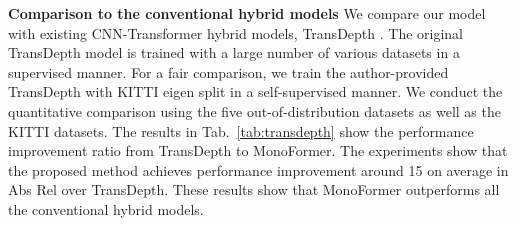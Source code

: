 \documentclass[letterpaper]{article} \usepackage{aaai23}  \usepackage{times}  \usepackage{helvet}  \usepackage{courier}  \usepackage[hyphens]{url}  \usepackage{graphicx} \urlstyle{rm} \def\UrlFont{\rm}  \usepackage{natbib}  \usepackage{caption} \frenchspacing  \setlength{\pdfpagewidth}{8.5in} \setlength{\pdfpageheight}{11in} \usepackage{algorithm}
\newcommand{\tabref}[1]{Tab.~\ref{#1}}
\begin{document}
\begin{table}[!t]
    \centering
    \small
    \caption{\textbf{Ablation study on backbone network.} We use only Transformers (ViT), CNNs (ResNet), and hybrid models (TransDepth \cite{yang2021transformer} and ours). ViT-B and ViT-L are the base and large ViT \cite{dosovitskiy2020image}, respectively. TransDepth and ours use the combination of ResNet50 and ViT-B/16. }
    \vspace{-2mm}
\label{table4_ablation_backbone}
\end{table}


\noindent \textbf{Comparison to the conventional hybrid models} 
We compare our model with existing CNN-Transformer hybrid models, TransDepth \cite{yang2021transformer}. The original TransDepth model is trained with a large number of various datasets in a supervised manner. For a fair comparison, we train the author-provided TransDepth with KITTI eigen split in a self-supervised manner. We conduct the quantitative comparison using the five out-of-distribution datasets as well as the KITTI datasets. The results in \tabref{tab:transdepth} show the performance improvement ratio from TransDepth to MonoFormer. The experiments show that the proposed method achieves performance improvement around 15 on average in Abs Rel over TransDepth. These results show that MonoFormer outperforms all the conventional hybrid models.
\end{document}
